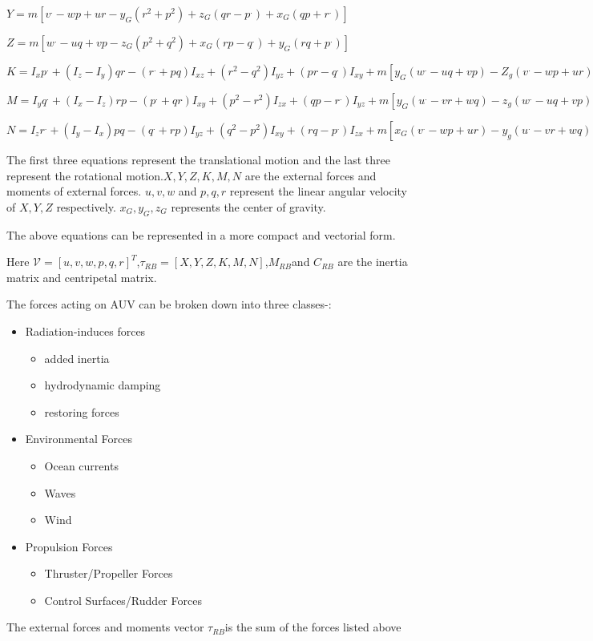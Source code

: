 \documentclass[12pt]{dalcsthesis}
\begin{document}
$Y=m[v^{.}-wp+ur-y_{G}(r^{2}+p^{2})+z_{G}(qr-p^{.})+x_{G}(qp+r^{.})]$

$Z=m[w^{.}-uq+vp-z_{G}(p^{2}+q^{2})+x_{G}(rp-q^{.})+y_{G}(rq+p^{.})]$

$K=I_{x}p^{.}+(I_{z}-I_{y})qr-(r^{.}+pq)I_{xz}+(r^{2}-q^{2})I_{yz}+(pr-q^{.})I_{xy}+m[y_{G}(w^{.}-uq+vp)-Z_{g}(v^{.}-wp+ur)]$

$M=I_{y}q^{.}+(I_{x}-I_{z})rp-(p^{.}+qr)I_{xy}+(p^{2}-r^{2})I_{zx}+(qp-r^{.})I_{yz}+m[y_{G}(u^{.}-vr+wq)-z_{g}(w^{.}-uq+vp)]$

$N=I_{z}r^{.}+(I_{y}-I_{x})pq-(q^{.}+rp)I_{yz}+(q^{2}-p^{2})I_{xy}+(rq-p^{.})I_{zx}+m[x_{G}(v^{.}-wp+ur)-y_{g}(u^{.}-vr+wq)]$

The first three equations represent the translational motion and the
last three represent the rotational motion.$X,Y,Z,K,M,N$ are the
external forces and moments of external forces. $u,v,w$ and $p,q,r$
represent the linear angular velocity of $X,Y,Z$ respectively. $x_{G},y_{G},z_{G}$
represents the center of gravity.

The above equations can be represented in a more compact and vectorial
form.


Here $\mathcal{V}=[u,v,w,p,q,r]^{T}$,$\tau_{RB}=[X,Y,Z,K,M,N]$,$M_{RB}$and
$C_{RB}$ are the inertia matrix and centripetal matrix. 

The forces acting on AUV can be broken down into three classes-:
\begin{itemize}
\item Radiation-induces forces

\begin{itemize}
\item added inertia
\item hydrodynamic damping
\item restoring forces
\end{itemize}
\item Environmental Forces

\begin{itemize}
\item Ocean currents
\item Waves
\item Wind
\end{itemize}
\item Propulsion Forces

\begin{itemize}
\item Thruster/Propeller Forces
\item Control Surfaces/Rudder Forces
\end{itemize}
\end{itemize}
The external forces and moments vector $\tau_{RB}$is the sum of the
forces listed above 
\end{document}
